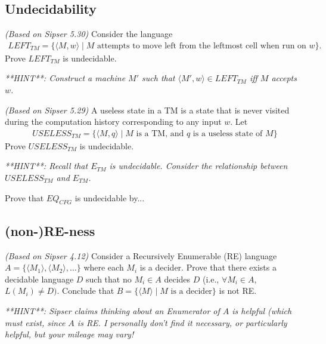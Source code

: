 \documentclass{exam}
\theoremstyle{definition}
\begin{document}
\subsection*{Undecidability}
\begin{questions}
    \question \textit{(Based on Sipser 5.30)} Consider the language 
    \begin{align*}
    LEFT_{TM} = \{ \langle M, w \rangle \mid M \text{ attempts to move left from the leftmost cell when run on } w\}.
    \end{align*}
    Prove $LEFT_{TM}$ is undecidable.

    \textit{**HINT**: Construct a machine $M'$ such that $\langle M', w \rangle \in LEFT_{TM}$ iff $M$ accepts $w$.} 

    \question \textit{(Based on Sipser 5.29)} A useless state in a TM is a state that is never visited during the computation history corresponding to any input $w$. Let 
    \begin{align*}
        USELESS_{TM} = \{\langle M, q \rangle \mid M \text{ is a TM, and } q \text{ is a useless state of } M\}
    \end{align*} 
    Prove $USELESS_{TM}$ is undecidable.

    \textit{**HINT**: Recall that $E_{TM}$ is undecidable. Consider the relationship between $USELESS_{TM}$ and $E_{TM}$.}

    \question Prove that $EQ_{CFG}$ is undecidable by...
\end{questions}

\subsection*{(non-)RE-ness}
\begin{questions}
    \question \textit{(Based on Sipser 4.12)} Consider a Recursively Enumerable (RE) language $A = \{\langle M_1 \rangle, \langle M_2 \rangle, \dots \}$ where each $M_i$ is a decider. Prove that there exists a decidable language $D$ such that no $M_i \in A$ decides $D$ (i.e., $\forall M_i \in A$, $L(M_i) \neq D)$. Conclude that $B = \{\langle M \rangle \mid M \text{ is a decider}\}$ is not RE. 

    \textit{**HINT**: Sipser claims thinking about an Enumerator of $A$ is helpful (which must exist, since $A$ is RE. I personally don't find it necessary, or particularly helpful, but your mileage may vary!}
\end{questions}
\end{document}
